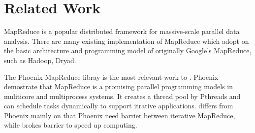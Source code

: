 \section{Related Work}
\label{sec:rel}
MapReduce is a popular distributed framework
for massive-scale parallel data analysis.
There are many existing implementation of MapReduce 
which adopt on the basic architecture and 
programming model of originally Google's MapReduce, 
such as Hadoop\cite{}, Dryad\cite{isard2007dryad}.


The Phoenix MapReduce libray\cite{ranger2007phoenix} 
is the most relevant work to \myds. 
Phoenix demostrate that MapReduce is a promising parallel programming
models in muliticore and multiprocess systems.
It creates a thread pool by Pthreads
and can schedule tasks dynamically to support itrative applications.
\myds differs from Phoenix mainly on that 
Phoenix need barrier between iterative MapReduce,
while \myds brokes barrier to speed up computing.


